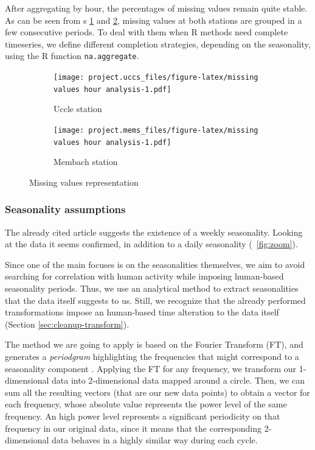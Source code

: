 \documentclass[12pt]{article}
\begin{document}
After aggregating by hour, the percentages of missing values remain quite stable. As can be seen from \figurename{s} \ref{missing-values-seconds:uccs} and \ref{missing-values-seconds:mems}, missing values at both stations are grouped in a few consecutive periods.
To deal with them when R methods need complete timeseries, we define different completion strategies, depending on the seasonality, using the R function \texttt{na.aggregate}.

\begin{figure}[t]
	\begin{subfigure}{.5\linewidth}
		\texttt{[image: project.uccs\_files/figure-latex/missing values hour analysis-1.pdf]}
		\caption{Uccle station}
		\label{missing-values-seconds:uccs}
	\end{subfigure}
	\begin{subfigure}{.5\linewidth}
		\texttt{[image: project.mems\_files/figure-latex/missing values hour analysis-1.pdf]}
		\caption{Membach station}
		\label{missing-values-seconds:mems}
	\end{subfigure}
	\caption{Missing values representation}
	\label{missing-values-seconds}
\end{figure}
%
\subsubsection{Seasonality assumptions}
The already cited article \cite{NatureCoronavirusSeismic} suggests the existence of a weekly seasonality. Looking at the data it seems confirmed, in addition to a daily seasonality (\figurename~\ref{fig:zoom}).

Since one of the main focuses is on the seasonalities themselves, we aim to avoid searching for correlation with human activity while imposing human-based seasonality periods. Thus, we use an analytical method to extract seasonalities that the data itself suggests to us. Still, we recognize that the already performed transformations impose an human-based time alteration to the data itself (Section \ref{sec:cleanup-transform}).

The method we are going to apply is based on the Fourier Transform (FT), and generates a \textit{periodgram} highlighting the frequencies that might correspond to a seasonality component \cite[chapter 11]{brockwell1991time}.
Applying the FT for any frequency, we transform our 1-dimensional data into 2-dimensional data mapped around a circle. Then, we can sum all the resulting vectors (that are our new data points) to obtain a vector for each frequency, whose absolute value represents the power level of the same frequency. An high power level represents a significant periodicity on that frequency in our original data, since it means that the corresponding 2-dimensional data behaves in a highly similar way during each cycle.
\end{document}
